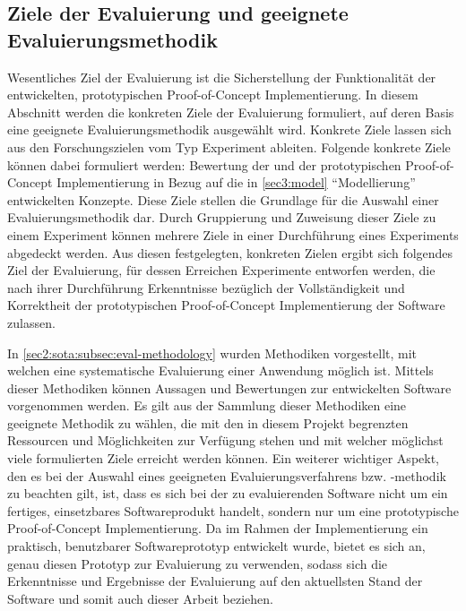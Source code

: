 \subsection[Ziele der Evaluierung und geeignete Evaluierungsmethodik]{\texorpdfstring{Ziele der Evaluierung und geeignete \\ Evaluierungsmethodik}{Ziele der Evaluierung und geeignete Evaluierungsmethodik}}
\label{sec5:eval:subsec:eval-goals-methodology}
Wesentliches Ziel der Evaluierung ist die Sicherstellung der Funktionalität der entwickelten, prototypischen Proof-of-Concept Implementierung.
In diesem Abschnitt werden die konkreten Ziele der Evaluierung formuliert, auf deren Basis eine geeignete Evaluierungsmethodik ausgewählt wird.
Konkrete Ziele lassen sich aus den Forschungszielen vom Typ Experiment ableiten.
Folgende konkrete Ziele können dabei formuliert werden:
Bewertung der  und  der prototypischen Proof-of-Concept Implementierung in Bezug auf die in \cref{sec3:model} \enquote{Modellierung} entwickelten Konzepte.
Diese Ziele stellen die Grundlage für die Auswahl einer Evaluierungsmethodik dar.
Durch Gruppierung und Zuweisung dieser Ziele zu einem Experiment können mehrere Ziele in einer Durchführung eines Experiments abgedeckt werden.
Aus diesen festgelegten, konkreten Zielen ergibt sich folgendes Ziel der Evaluierung, für dessen Erreichen Experimente entworfen werden, die nach ihrer Durchführung Erkenntnisse bezüglich der Vollständigkeit und Korrektheit der prototypischen Proof-of-Concept Implementierung der Software zulassen.

In \cref{sec2:sota:subsec:eval-methodology} wurden Methodiken vorgestellt, mit welchen eine systematische Evaluierung einer Anwendung möglich ist.
Mittels dieser Methodiken können Aussagen und Bewertungen zur entwickelten Software vorgenommen werden.
Es gilt aus der Sammlung dieser Methodiken eine geeignete Methodik zu wählen, die mit den in diesem Projekt begrenzten Ressourcen und Möglichkeiten zur Verfügung stehen und mit welcher möglichst viele formulierten Ziele erreicht werden können.
Ein weiterer wichtiger Aspekt, den es bei der Auswahl eines geeigneten Evaluierungsverfahrens bzw. -methodik zu beachten gilt, ist, dass es sich bei der zu evaluierenden Software nicht um ein fertiges, einsetzbares Softwareprodukt handelt, sondern nur um eine prototypische Proof-of-Concept Implementierung.
Da im Rahmen der Implementierung ein praktisch, benutzbarer Softwareprototyp entwickelt wurde, bietet es sich an, genau diesen Prototyp zur Evaluierung zu verwenden, sodass sich die Erkenntnisse und Ergebnisse der Evaluierung auf den aktuellsten Stand der Software und somit auch dieser Arbeit beziehen.

